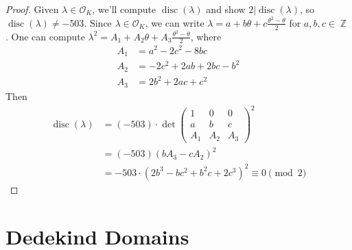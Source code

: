 \documentclass[11pt, a4paper]{memoir}
\DeclareMathOperator{\Z}{{\mathbb{Z}}}
\theoremstyle{change}
\theoremstyle{plain}
\theoremstyle{nonumberplain}
\newtheorem{proof}{Proof}
\DeclareMathOperator{\disc}{disc}
\begin{document}
\begin{proof}
    Given $\lambda\in\mathcal{O}_K$, we'll compute $\disc(\lambda)$ and show $2|\disc(\lambda)$, so $\disc(\lambda)\neq -503$.
    Since $\lambda\in\mathcal{O}_K$, we can write $\lambda=a+b\theta+c\frac{\theta^2-\theta}{2}$ for $a,b,c\in\Z$.
    One can compute $\lambda^2=A_1+A_2\theta+A_3\frac{\theta^2-\theta}{2}$, where
    \begin{align*}
        A_1&=a^2-2c^2-8bc\\
        A_2&=-2c^2+2ab+2bc-b^2\\
        A_3&= 2b^2+2ac+c^2
    \end{align*}
    Then
    \begin{align*}
        \disc(\lambda)&=(-503)\cdot\det
        \begin{pmatrix}
            1&0&0\\
            a&b&c\\
            A_1&A_2&A_3
        \end{pmatrix}^2\\
        &= (-503)(bA_3-cA_2)^2\\
        &=-503\cdot(2b^3-bc^2+b^2c+2c^3)^2\equiv 0\pmod{2}
    \end{align*}
\end{proof}
\chapter{Dedekind Domains}
\end{document}
